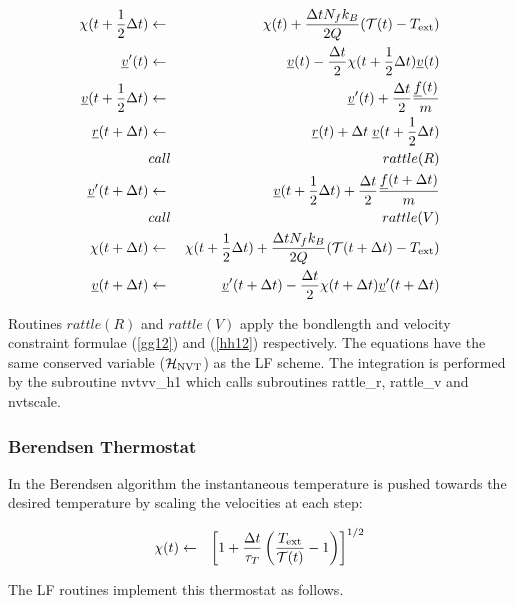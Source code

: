 \begin{eqnarray}
\chi(t+{1\over2}\Delta t) &\leftarrow& \chi(t) + {\Delta t N_fk_B  \over
2 Q} ( {\cal T}(t) - T_{\rm ext}) \nonumber\\
\mbox{$\underline{v}$}'(t)&\leftarrow& \mbox{$\underline{v}$}(t) -
 {\Delta t \over 2}\chi(t+{1\over 2}\Delta t)\mbox{$\underline{v}$}(t)\nonumber\\
\mbox{$\underline{v}$}(t + {1\over 2} \Delta t)&\leftarrow& \mbox{$\underline{v}$}'(t)
+ {\Delta t \over 2} {\mbox{$\underline{f}$}(t)\over m} \nonumber \\
\mbox{$\underline{r}$}(t+\Delta t) &\leftarrow& \mbox{$\underline{r}$}(t) + \Delta t \;
\mbox{$\underline{v}$}(t+{1\over 2}\Delta t)\nonumber \\
&call&rattle(R) \nonumber \\
\mbox{$\underline{v}$}'(t + \Delta t)&\leftarrow& \mbox{$\underline{v}$}(t + {1 \over 2}\Delta t) +
 {\Delta t \over 2} {\mbox{$\underline{f}$}(t + \Delta t)\over m} \nonumber \\
&call&rattle(V) \nonumber \\
\chi(t+\Delta t) &\leftarrow& \chi(t+{1\over 2}\Delta t) + {\Delta t
N_f k_B \over 2Q }( {{\cal T}(t+\Delta t) - T_{\rm ext}} ) \nonumber \\
\mbox{$\underline{v}$}(t + \Delta t)&\leftarrow& \mbox{$\underline{v}$}'(t + \Delta t) -
 {\Delta t \over 2}\chi(t+\Delta t)\mbox{$\underline{v}$}'(t+\Delta t)
\end{eqnarray}

Routines $rattle(R)$ and $rattle(V)$ apply the bondlength and velocity
constraint formulae (\ref{gg12}) and (\ref{hh12}) respectively.  The
equations have the same conserved variable (${\cal H}_{\rm NVT}$) as
the LF scheme. The integration is performed by the subroutine {\sc
nvtvv\_h1} which calls subroutines {\sc rattle\_r, rattle\_v} and {\sc
nvtscale}. 

\subsubsection{Berendsen Thermostat}
In the Berendsen algorithm the instantaneous temperature is pushed
towards the desired temperature by scaling the velocities at each
step:

\begin{eqnarray}
\chi(t) &\leftarrow& \left[ 1+ {\Delta t\over \tau_T}\left({T_{\rm ext}\over {\cal T}(t)}-1\right)
\right]^{1/2}
\end{eqnarray}

The \D{} LF routines implement this thermostat as follows.

